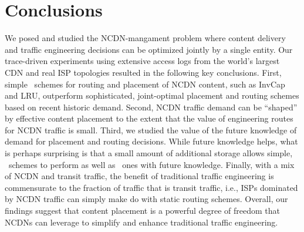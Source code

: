 \section{Conclusions}
\label{sec:concl-ncdn}


We posed and studied the NCDN-mangament problem where content delivery and traffic engineering decisions can be optimized jointly by a single entity. %
Our trace-driven experiments using extensive access logs from the world's largest CDN and real ISP topologies resulted in the following key conclusions. First, simple \unplanned\ schemes for routing and placement of NCDN content, such as InvCap and LRU, outperform sophisticated, joint-optimal placement and routing schemes based on recent historic demand. Second,  NCDN traffic demand can be ``shaped'' by effective content placement to the extent that the value of engineering routes for NCDN traffic is small.  Third, we studied the value of the future knowledge of demand for placement and routing decisions. While future knowledge helps, what is perhaps surprising is that a small amount of additional storage allows simple, \unplanned\ schemes to perform as well as \planned\ ones with future knowledge. Finally, with a mix of NCDN and transit traffic, the benefit of traditional traffic engineering is commensurate to the fraction of traffic that is transit traffic, i.e., ISPs dominated by NCDN traffic can simply make do with static routing schemes.  Overall, our findings suggest that content placement is a powerful degree of freedom that NCDNs can leverage to simplify and enhance traditional traffic engineering.




